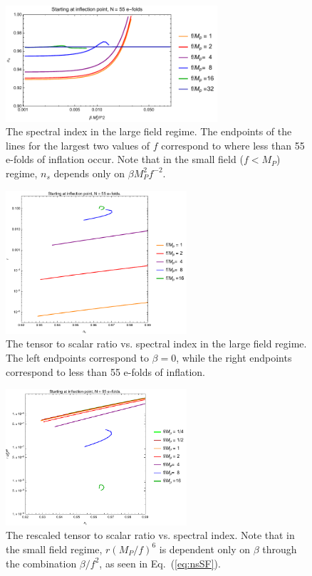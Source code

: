 \documentclass[aps,amsfonts,amsmath,prd,preprint,nofootinbib]{revtex4}
\newcommand{\Mp}{{M_{P}}}
\newcommand{\MMp}{{M_P^2}}
\begin{document}
\begin{figure}[!h]
  \centering
    \includegraphics[width=0.7\textwidth]{figures/nsvsb.pdf}
    \caption{The spectral index in the large field regime. The endpoints of the lines for the largest two values of $f$ correspond to where less than 55 e-folds of inflation occur.
    Note that in the small field ($f < \Mp$) regime, $n_s$ depends only on $\beta \MMp f^{-2}$.}
\end{figure}

\begin{figure}[!h]
  \centering
    \includegraphics[width=0.6\textwidth]{figures/nsrplotvsf.pdf}
    \caption{The tensor to scalar ratio vs. spectral index in the large field regime.  The left endpoints correspond to $\beta = 0$, while the right endpoints correspond to less than 55 e-folds of inflation.}
\end{figure}

\begin{figure}[!h]
  \centering
    \includegraphics[width=0.6\textwidth]{figures/nsrf6plotvsf.pdf}
    \caption{The rescaled tensor to scalar ratio vs. spectral index. Note that in the small field regime, $r (\Mp/f)^6$ is dependent only on $\beta$ through the combination $\beta/f^2$, as seen in Eq.~(\ref{eq:nsSF}).}
\end{figure}
\end{document}
